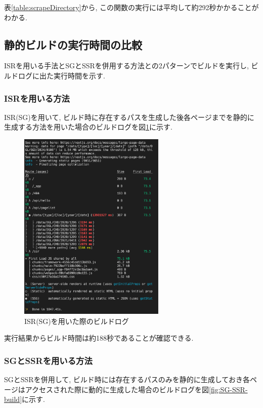 表\ref{table:scrapeDirectory}から, この関数の実行には平均して約292秒かかることがわかる. 

\subsection{静的ビルドの実行時間の比較}
ISRを用いる手法とSGとSSRを併用する方法との2パターンでビルドを実行し, ビルドログに出た実行時間を示す.
\subsubsection{ISRを用いる方法}
ISR(SG)を用いて, ビルド時に存在するパスを生成した後各ページまでを静的に生成する方法を用いた場合のビルドログを図\ref{fig:ISR-build}に示す.

\begin{figure}[htbp]
	\begin{center}
		\includegraphics[width=70mm]{./images/ISR-log.png}
		\caption{ISR(SG)を用いた際のビルドログ}\label{fig:ISR-build}
	\end{center}
\end{figure}

実行結果からビルド時間は約188秒であることが確認できる.

\subsubsection{SGとSSRを用いる方法}
SGとSSRを併用して, ビルド時には存在するパスのみを静的に生成しておき各ページはアクセスされた際に動的に生成した場合のビルドログを図\ref{fig:SG-SSR-build}に示す.

